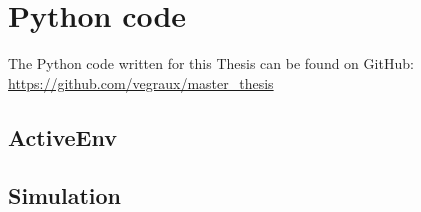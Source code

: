 \documentclass[11pt]{book}
\begin{document}
\chapter{Python code}
The Python code written for this Thesis can be found on GitHub: \url{https://github.com/vegraux/master_thesis}
\section{ActiveEnv}



\section{Simulation}

\end{document}
